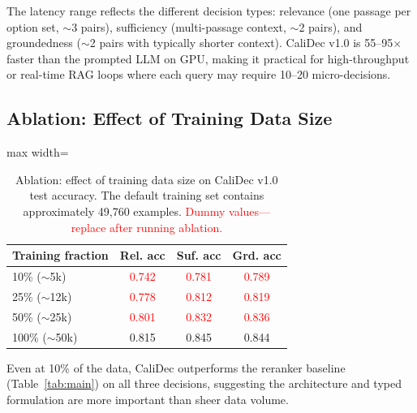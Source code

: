 \documentclass[twocolumn]{ICCKjournal}
\newcommand{\ph}[1]{\textcolor{red}{#1}}
\begin{document}
The latency range reflects the different decision types: relevance (one passage per option set, $\sim$3 pairs), sufficiency (multi-passage context, $\sim$2 pairs), and groundedness ($\sim$2 pairs with typically shorter context). CaliDec v1.0 is 55--95$\times$ faster than the prompted LLM on GPU, making it practical for high-throughput or real-time RAG loops where each query may require 10--20 micro-decisions.

\subsection{Ablation: Effect of Training Data Size}
\label{sec:ablation_data}
\begin{table}[H]
\caption{Ablation: effect of training data size on CaliDec v1.0 test accuracy. The default training set contains approximately 49,760 examples. \textcolor{red}{Dummy values---replace after running ablation.}}
\label{tab:ablation_data}
\centering
\small
\begin{adjustbox}{max width=\linewidth}
\begin{tabular}{lccc}
\toprule
\textbf{Training fraction} & \textbf{Rel. acc} & \textbf{Suf. acc} & \textbf{Grd. acc} \\
\midrule
10\% ($\sim$5k)   & \ph{0.742} & \ph{0.781} & \ph{0.789} \\
25\% ($\sim$12k)  & \ph{0.778} & \ph{0.812} & \ph{0.819} \\
50\% ($\sim$25k)  & \ph{0.801} & \ph{0.832} & \ph{0.836} \\
100\% ($\sim$50k) & 0.815      & 0.845      & 0.844      \\
\bottomrule
\end{tabular}
\end{adjustbox}
\end{table}

Even at 10\% of the data, CaliDec outperforms the reranker baseline (Table~\ref{tab:main}) on all three decisions, suggesting the architecture and typed formulation are more important than sheer data volume.
\end{document}
